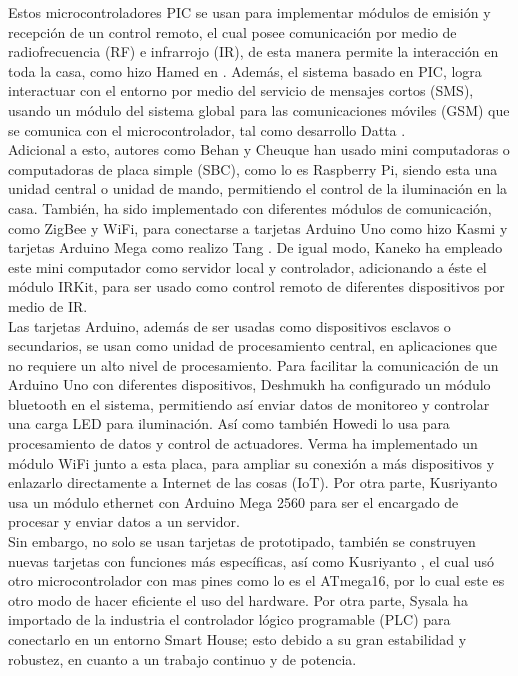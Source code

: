 Estos microcontroladores PIC se usan para implementar módulos de emisión y recepción de un control remoto, el cual posee comunicación por medio de radiofrecuencia (RF) e infrarrojo (IR), de esta manera permite la interacción en toda la casa, como hizo Hamed en \cite{Hamed2012}. Además, el sistema basado en PIC, logra interactuar con el entorno por medio del servicio de mensajes cortos (SMS), usando un módulo del sistema global para las comunicaciones móviles (GSM) que se comunica con el microcontrolador, tal como desarrollo Datta \cite{Datta2014}.\\

Adicional a esto, autores como Behan \cite{Behan2013}  y Cheuque \cite{Cheuque2015} han usado mini computadoras o computadoras de placa simple (SBC), como lo es Raspberry Pi,  siendo esta una unidad central o unidad de mando, permitiendo el control de la iluminación en la casa. También, ha sido implementado con diferentes módulos de comunicación, como ZigBee y WiFi, para conectarse a tarjetas Arduino Uno como hizo Kasmi \cite{Kasmi2016} y tarjetas Arduino Mega como realizo Tang \cite{Tang2017}. De igual modo, Kaneko \cite{Kaneko2017} ha empleado este mini computador como servidor local y controlador, adicionando a éste el módulo IRKit, para ser usado como control remoto de diferentes dispositivos por medio de IR.\\

Las tarjetas Arduino, además de ser usadas como dispositivos esclavos o secundarios, se usan como unidad de procesamiento central, en aplicaciones que no requiere un alto nivel de procesamiento. Para facilitar la comunicación de un Arduino Uno con diferentes dispositivos, Deshmukh \cite{Deshmukh2016} ha configurado un módulo bluetooth en el sistema, permitiendo así enviar datos de monitoreo y controlar una carga LED para iluminación. Así como también Howedi \cite{Howedi2016} lo usa para procesamiento de datos y control de actuadores. Verma \cite{Verma2016} ha implementado un módulo WiFi junto a esta placa, para ampliar su conexión a más dispositivos y enlazarlo directamente a Internet de las cosas (IoT). Por otra parte, Kusriyanto \cite{Kusriyanto2016} usa un módulo ethernet con Arduino Mega 2560 para ser el encargado de procesar y enviar datos a un servidor.\\

Sin embargo, no solo se usan tarjetas de prototipado, también se construyen nuevas tarjetas con funciones más específicas, así como Kusriyanto \cite{Kusriyanto2015}, el cual usó otro microcontrolador con mas pines como lo es el ATmega16, por lo cual este es otro modo de hacer eficiente el uso del hardware. Por otra parte, Sysala \cite{Sysala2016} ha importado de la industria el controlador lógico programable (PLC) para conectarlo en un entorno Smart House; esto debido a su gran estabilidad y robustez, en cuanto a un trabajo continuo y de potencia.\\

